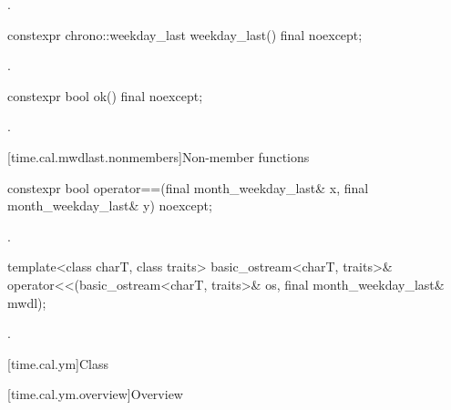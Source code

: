 \begin{itemdescr}
\pnum
\returns {}.
\end{itemdescr}

%
\begin{itemdecl}
constexpr chrono::weekday_last weekday_last() final noexcept;
\end{itemdecl}

\begin{itemdescr}
\pnum
\returns {}.
\end{itemdescr}

%
\begin{itemdecl}
constexpr bool ok() final noexcept;
\end{itemdecl}

\begin{itemdescr}
\pnum
\returns {}.
\end{itemdescr}

[time.cal.mwdlast.nonmembers]{Non-member functions}

%
\begin{itemdecl}
constexpr bool operator==(final month_weekday_last& x, final month_weekday_last& y) noexcept;
\end{itemdecl}

\begin{itemdescr}
\pnum
\returns {}.
\end{itemdescr}

%
\begin{itemdecl}
template<class charT, class traits>
  basic_ostream<charT, traits>&
    operator<<(basic_ostream<charT, traits>& os, final month_weekday_last& mwdl);
\end{itemdecl}

\begin{itemdescr}
\pnum
\returns {}.
\end{itemdescr}

[time.cal.ym]{Class }

[time.cal.ym.overview]{Overview}

